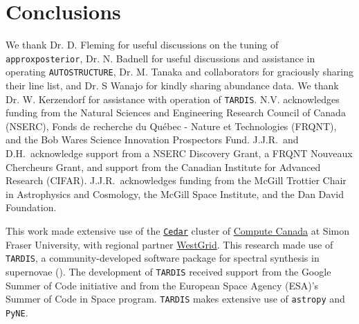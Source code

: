 \documentclass[twocolumn]{aastex63}
\begin{document}
\section{Conclusions}\label{sec:conclusions}

\acknowledgments
We thank Dr. D. Fleming for useful discussions on the tuning of \texttt{approxposterior}, Dr. N. Badnell for useful discussions and assistance in operating \texttt{AUTOSTRUCTURE}, Dr. M. Tanaka and collaborators for graciously sharing their line list, and Dr. S Wanajo for kindly sharing abundance data. We thank Dr. W. Kerzendorf for assistance with operation of \texttt{TARDIS}. N.V. acknowledges funding from the Natural Sciences and Engineering Research Council of Canada (NSERC), Fonds de recherche du Qu\'ebec - Nature et Technologies (FRQNT), and the Bob Wares Science Innovation Prospectors Fund. J.J.R.\ and D.H.\ acknowledge support from a NSERC Discovery Grant, a  FRQNT Nouveaux Chercheurs Grant, and support from the Canadian Institute for Advanced Research (CIFAR).  J.J.R.\ acknowledges funding from the McGill Trottier Chair in Astrophysics and Cosmology, the McGill Space Institute, and the Dan David Foundation.

This work made extensive use of the \href{https://docs.computecanada.ca/wiki/Cedar}{\texttt{Cedar}} cluster of \href{https://www.computecanada.ca/home/}{Compute Canada} at Simon Fraser University, with regional partner \href{https://www.westgrid.ca/}{WestGrid}. This research made use of \texttt{TARDIS}, a community-developed software package for spectral synthesis in supernovae (\citealt{kerzendorf14}). The development of \texttt{TARDIS} received support from the Google Summer of Code initiative and from the European Space Agency (ESA)'s Summer of Code in Space program. \texttt{TARDIS} makes extensive use of \texttt{astropy} and \texttt{PyNE}. 
\newline
\end{document}
